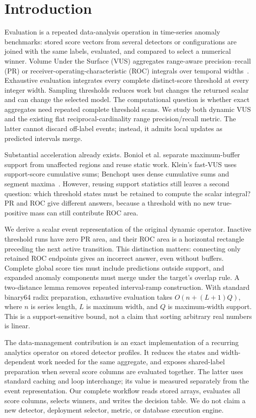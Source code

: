 \section{Introduction}
Evaluation is a repeated data-analysis operation in time-series anomaly
benchmarks: stored score vectors from several detectors or configurations are
joined with the same labels, evaluated, and compared to select a numerical
winner. Volume Under the Surface (VUS) aggregates range-aware precision--recall
(PR) or receiver-operating-characteristic (ROC) integrals over temporal
widths~\cite{paparrizos2022,boniol2025}. Exhaustive evaluation integrates every
complete distinct-score threshold at every integer width. Sampling thresholds
reduces work but changes the returned scalar and can change the selected model.
The computational question is whether exact aggregates need repeated complete
threshold scans. We study both dynamic VUS and the existing flat
reciprocal-cardinality range precision/recall metric. The latter cannot discard
off-label events; instead, it admits local updates as predicted intervals merge.

Substantial acceleration already exists. Boniol et al. separate
maximum-buffer support from unaffected regions and reuse static work.
Klein's fast-VUS uses support-score cumulative sums; Benchopt uses dense
cumulative sums and segment maxima~\cite{boniol2025,klein2026,benchopt2026}.
However, reusing support statistics still leaves a second question: which
threshold states must be retained to compute the scalar integral? PR and ROC
give different answers, because a threshold with no new true-positive mass
can still contribute ROC area.

We derive a scalar event representation of the original dynamic operator.
Inactive threshold runs have zero PR area, and their ROC area is a horizontal
rectangle preceding the next active transition. This distinction matters:
connecting only retained ROC endpoints gives an incorrect answer, even without
buffers. Complete global score ties must include predictions outside support,
and expanded anomaly components must merge under the target's overlap rule.
A two-distance lemma removes repeated interval-ramp construction. With standard
binary64 radix preparation, exhaustive evaluation takes
$O(n+(L+1)Q)$, where $n$ is series length, $L$ is maximum width, and $Q$ is
maximum-width support. This is a support-sensitive bound, not a claim that
sorting arbitrary real numbers is linear.

The data-management contribution is an exact implementation of a recurring
analytics operator on stored detector profiles. It reduces the states and
width-dependent work needed for the same aggregate, and exposes shared-label
preparation when several score columns are evaluated together. The latter uses
standard caching and loop interchange; its value is measured separately from
the event representation. Our complete workflow reads stored arrays, evaluates
all score columns, selects winners, and writes the decision table. We do not
claim a new detector, deployment selector, metric, or database execution engine.

